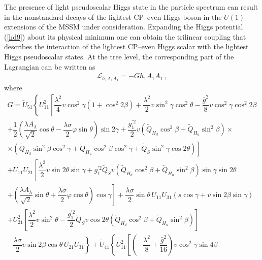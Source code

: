 \documentclass[12pt,a4paper]{article}
\begin{document}
The presence of light pseudoscalar Higgs state in the particle spectrum can result in the nonstandard decays of the lightest
CP--even Higgs boson in the $U(1)$ extensions of the MSSM under consideration. Expanding
the Higgs potential  (\ref{hd9}) about its physical minimum one can obtain the trilinear coupling that describes the interaction
of the lightest CP--even Higgs scalar with the lightest Higgs pseudoscalar states. At the tree level, the corresponding part
of the Lagrangian can be written as
\begin{equation}
\begin{array}{l}
\mathcal{L}_{h_1 A_1 A_1}=-G h_1 A_1 A_1\,,
\end{array}
\label{hd29}
\end{equation}
where
\begin{equation}
\begin{array}{l}
G=\tilde{U}_{51}\left\{U_{11}^2 \left[\dfrac{\lambda^2}{4}v\cos^2\gamma (1+\cos^2 2\beta) + \dfrac{\lambda^2}{2} v \sin^2 \gamma \cos^2 \theta
-\dfrac{\bar{g}^2}{8} v \cos^2 \gamma \cos^2 2\beta \right.\right.\\[1mm]
\left.\left.+\dfrac{1}{2}\left(\dfrac{\lambda A_{\lambda}}{\sqrt{2}} \cos\theta -
\dfrac{\lambda \sigma}{2} \varphi \sin\theta\right)\sin 2\gamma+
\dfrac{g_1^{'2}}{2}v\left(\tilde{Q}_{H_d}\cos^2\beta+\tilde{Q}_{H_u}\sin^2\beta\right)\times\right.\right.\\[1mm]
\left.\left.\times\left(\tilde{Q}_{H_d}\sin^2\beta \cos^2\gamma +
\tilde{Q}_{H_u}\cos^2\beta \cos^2\gamma +\tilde{Q}_{S}\sin^2\gamma \cos 2\theta\right)\right]\right.\\[1mm]
\left.+ U_{11} U_{21} \left[\dfrac{\lambda^2}{2} v \sin 2\theta \sin \gamma + g_1^{'2} \tilde{Q}_S v \left(\tilde{Q}_{H_d}\cos^2\beta
+\tilde{Q}_{H_u}\sin^2\beta\right) \sin\gamma \sin 2\theta \right.\right.\\[1mm]
\left.\left. + \left(\dfrac{\lambda A_{\lambda}}{\sqrt{2}}\sin\theta + \dfrac{\lambda \sigma}{2} \varphi \cos\theta\right) \cos\gamma\right]
+ \dfrac{\lambda\sigma}{2} \sin\theta\, U_{11} U_{31} (s\cos\gamma + v \sin 2\beta \sin\gamma)\right.\\[1mm]
\left. + U_{21}^2\left[\dfrac{\lambda^2}{2}v\sin^2\theta - \dfrac{g_1^{'2}}{2} \tilde{Q}_S v \cos 2\theta
\left(\tilde{Q}_{H_d}\cos^2\beta+\tilde{Q}_{H_u}\sin^2\beta\right)\right] \right.\\[1mm]
\left.- \dfrac{\lambda\sigma}{2} v \sin 2\beta \cos\theta\, U_{21} U_{31} \right\}
+\tilde{U}_{41}\left\{U_{11}^2 \left[\left(-\dfrac{\lambda^2}{8}+\dfrac{\bar{g}^2}{16}\right)v\cos^2\gamma \sin 4\beta\right.\right.\\[1mm]

\end{array}
\end{equation}
\end{document}
